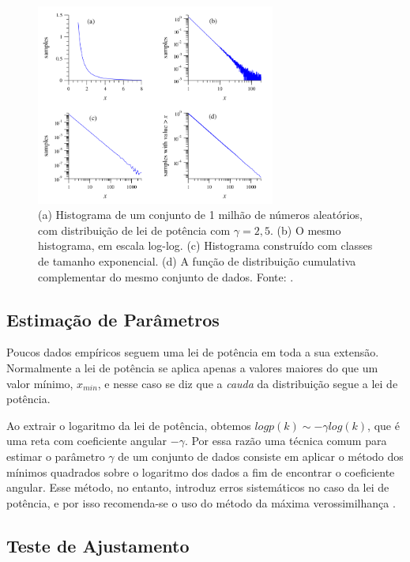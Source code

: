 \documentclass{article}
\begin{document}
\begin{figure} \label{fig:histogramas}
\centering
\includegraphics[width=0.7\textwidth]{histogramas}
\caption{(a) Histograma de um conjunto de 1 milhão de números aleatórios, com distribuição de lei de potência com $\gamma = 2,5$. (b) O mesmo histograma, em escala log-log. (c) Histograma construído com classes de tamanho exponencial. (d) A função de distribuição cumulativa complementar do mesmo conjunto de dados. Fonte: \cite{Newman2005}.}
\end{figure}


\subsection{Estimação de Parâmetros}

Poucos dados empíricos seguem uma lei de potência em toda a sua extensão. Normalmente a lei de potência se aplica apenas a valores maiores do que um valor mínimo, $x_{min}$, e nesse caso se diz que a \emph{cauda} da distribuição segue a lei de potência.

Ao extrair o logaritmo da lei de potência, obtemos $log p(k) \sim -\gamma log(k)$, que é uma reta com coeficiente angular $-\gamma$. Por essa razão uma técnica comum para estimar o parâmetro $\gamma$ de um conjunto de dados consiste em aplicar o método dos mínimos quadrados sobre o logaritmo dos dados a fim de encontrar o coeficiente angular. Esse método, no entanto, introduz erros sistemáticos no caso da lei de potência, e por isso recomenda-se o uso do método da máxima verossimilhança \cite{Clauset2007}.

\subsection{Teste de Ajustamento}
\end{document}
